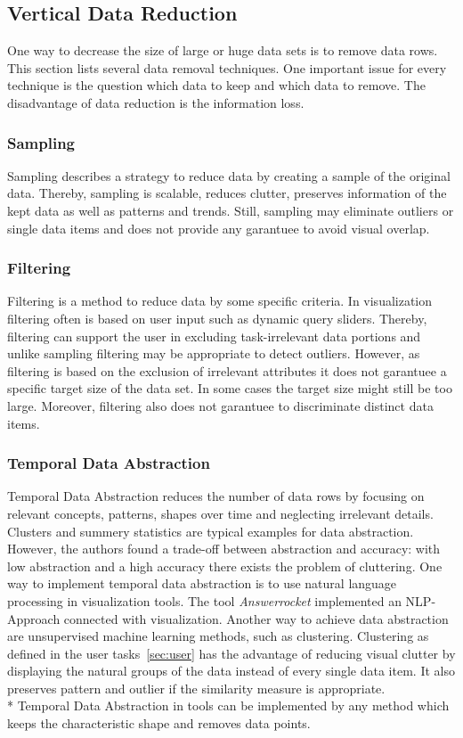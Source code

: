 \subsection{Vertical Data Reduction}
One way to decrease the size of large or huge data sets is to remove data rows. This section lists several data removal techniques. One important issue for every technique is the question which data to keep and which data to remove. The disadvantage of data reduction is the information loss.
\subsubsection*{Sampling}
Sampling describes a strategy to reduce data by creating a sample of the original data. Thereby, sampling is scalable, reduces clutter, preserves information of the kept data as well as patterns and trends\cite{PiringerHarald2011}. Still, sampling may eliminate outliers or single data items and does not provide any garantuee to avoid visual overlap. 
\subsubsection*{Filtering}
Filtering is a method to reduce data by some specific criteria. In visualization filtering often is based on user input such as dynamic query sliders. Thereby, filtering can support the user in excluding task-irrelevant data portions and unlike sampling filtering may be appropriate to detect outliers. However, as filtering is based on the exclusion of irrelevant attributes it does not garantuee a specific target size of the data set. In some cases the target size might still be too large. Moreover, filtering also does not garantuee to discriminate distinct data items\cite{PiringerHarald2011}.
\subsubsection*{Temporal Data Abstraction}
Temporal Data Abstraction\cite{Aigner2011} reduces the number of data rows by focusing on relevant concepts, patterns, shapes over time and neglecting irrelevant details. Clusters and summery statistics\cite{PiringerHarald2011} are typical examples for data abstraction. However, the authors found a trade-off between abstraction and accuracy: with low abstraction and a high accuracy there exists the problem of cluttering. 
One way to implement temporal data abstraction is to use natural language processing in visualization tools. The tool \textit{Answerrocket} implemented an NLP-Approach connected with visualization. Another way to achieve data abstraction are unsupervised machine learning methods, such as clustering.
Clustering as defined in the user tasks~\ref{sec:user} has the advantage of reducing visual clutter by displaying the natural groups of the data instead of every single data item. It also preserves pattern and outlier if the similarity measure is appropriate.\\*
Temporal Data Abstraction in tools can be implemented by any method which keeps the characteristic shape and removes data points. 
